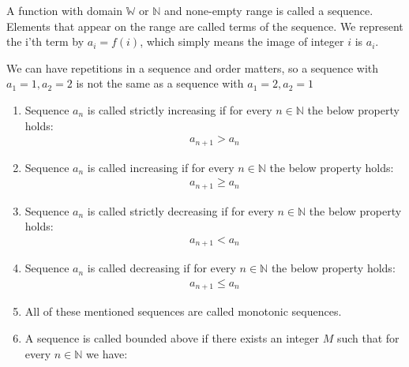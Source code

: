 
\begin{DEFINITION}
    \p
    A function with domain $\mathbb{W}$ or $\mathbb{N}$ and none-empty range is called a sequence.
  Elements that appear on the range are called {\color{red}terms} of the sequence. We represent the i'th term by $a_i = f(i)$, which simply means the image of integer $i$ is $a_i$.
\end{DEFINITION}

\p
We can have repetitions in a sequence and order matters, so a sequence with $a_1 = 1 , a_2 = 2$ is not the same as a sequence with $a_1 = 2, a_2 = 1$ 

\begin{DEFINITION}
    \begin{enumerate}
        \item     
            Sequence $a_n$ is called {\color{red}strictly increasing} if for every $n \in \mathbb{N}$ the below property holds:
            \begin{align*}
                a_{n + 1} > a_n
            \end{align*}
        \item 
            Sequence $a_n$ is called {\color{red}increasing} if for every $n \in \mathbb{N}$ the below property holds:
            \begin{align*}
                a_{n + 1} \geq a_n
            \end{align*}
        \item
            Sequence $a_n$ is called {\color{red}strictly decreasing} if for every $n \in \mathbb{N}$ the below property holds:
            \begin{align*}
                a_{n + 1} < a_n
            \end{align*}
        \item
            Sequence $a_n$ is called {\color{red}decreasing} if for every $n \in \mathbb{N}$ the below property holds:
            \begin{align*}
                a_{n + 1} \leq a_n
            \end{align*}
        \item
            All of these mentioned sequences are called {\color{red} monotonic} sequences.
        \item
            A sequence is called {\color{red} bounded above} if there exists an integer $M$ such that for every $n \in \mathbb{N}$ we have:
            \begin{align*}

\end{align*}
\end{enumerate}
\end{DEFINITION}
